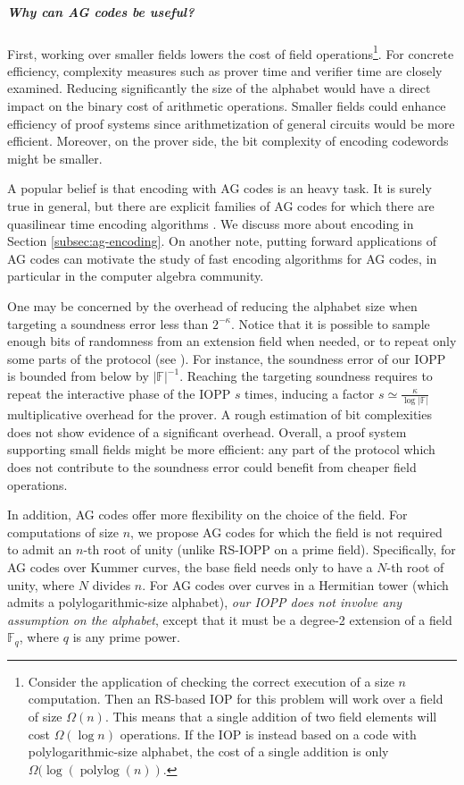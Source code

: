 \documentclass[10pt,a4paper]{article}
\newcommand\F{\mathbb{F}}
\newcommand\Fq{\mathbb{F}_q}
\DeclareMathOperator{\polylog}{polylog}
\newcommand{\size}[1]{\left|#1\right|}
\theoremstyle{plain}
\theoremstyle{plain}
\theoremstyle{definition}
\theoremstyle{remark}
\theoremstyle{plain}
\begin{document}
\subparagraph*{Why can AG codes be useful?}
First, working over smaller fields lowers the cost of field operations\footnote{Consider the application of checking the correct execution of a size $n$ computation. Then an RS-based IOP for this problem will work over a field of size $\Omega(n)$. This means that a single addition of two field elements will cost $\Omega(\log n)$ operations. If the IOP is instead based on a code with polylogarithmic-size alphabet, the cost of a single addition is only $\Omega(\log(\polylog(n))$.}. For concrete efficiency, complexity measures such as prover time and verifier time are closely examined. Reducing significantly the size of the alphabet would have a direct impact on the binary cost of arithmetic operations.   
Smaller fields could enhance efficiency of proof systems since arithmetization of general circuits would be more efficient. Moreover, on the prover side, the bit complexity of encoding codewords might be smaller.


A popular belief is that encoding with AG codes is an heavy task. It is surely true in general, but there are explicit families of AG codes for which there are quasilinear time encoding algorithms \cite{BRS20}. We discuss more about encoding in Section \ref{subsec:ag-encoding}. On another note, putting forward applications of AG codes can motivate the study of fast encoding algorithms for AG codes, in particular in the computer algebra community.



One may be concerned by the overhead of reducing the alphabet size when targeting a soundness error less than $2^{-\kappa}$. Notice that it is possible to sample enough bits of randomness from an extension field when needed, or to repeat only some parts of the protocol (see \cite{ethSTARK,BBHR18a}). For instance, the soundness error of our IOPP is bounded from below by $\size \F^{-1}$. Reaching the targeting soundness requires to repeat the interactive phase of the IOPP $s$ times, inducing a factor $s \simeq \frac{\kappa}{\log \size \F}$ multiplicative overhead for the prover. A rough estimation of bit complexities does not show evidence of a significant overhead. Overall, a proof system supporting small fields might be more efficient: any part of the protocol which does not contribute to the soundness error could benefit from cheaper field operations. 


In addition, AG codes offer more flexibility on the choice of the field. For computations of size $n$, we propose AG codes for which the field is not required to admit an $n$-th root of unity (unlike RS-IOPP on a prime field). Specifically, for AG codes over Kummer curves, the base field needs only to have a $N$-th root of unity, where $N$ divides $n$. For AG codes over curves in a Hermitian tower (which admits a polylogarithmic-size alphabet), \emph{our IOPP does not involve any assumption on the alphabet}, except that it must be a degree-2 extension of a field $\Fq$, where $q$ is any prime power.
\end{document}
